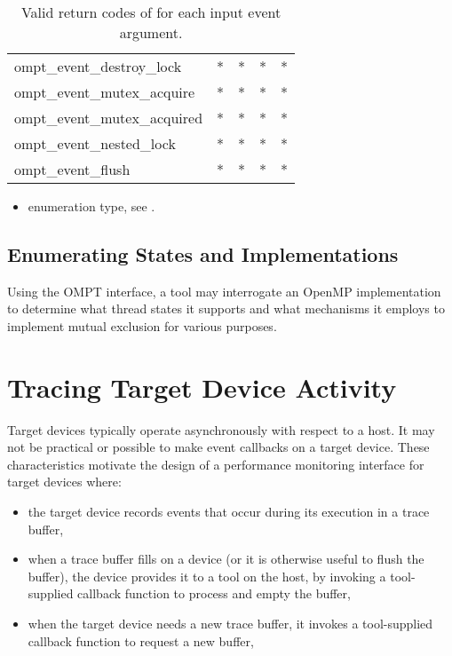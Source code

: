 \begin{table}
\begin{tabular}{lp{3em}p{3em}p{3em}p{3em}}
ompt\_event\_destroy\_lock          & * & * & * & * \\
ompt\_event\_mutex\_acquire         & * & * & * & * \\
ompt\_event\_mutex\_acquired        & * & * & * & * \\
ompt\_event\_nested\_lock           & * & * & * & * \\
ompt\_event\_flush                  & * & * & * & * \\
\bottomrule
\end{tabular}
\caption{Valid return codes of  for each input event argument.}
\label{table:valid_rc}
\end{table}

\crossreferences
\begin{itemize}
\item {} enumeration type, see
.
\end{itemize}

\clearpage

\subsection{Enumerating States and Implementations}
Using the OMPT interface, a tool may interrogate an OpenMP implementation to 
determine what thread states it supports and what mechanisms it employs to 
implement mutual exclusion for various purposes.

\section{Tracing Target Device Activity}
\label{sec:tracing-target-device-activity}

Target devices typically operate asynchronously with respect to a
host. It may not be practical or possible to make event callbacks
on a target device. These characteristics motivate the design of a
performance monitoring interface for target devices where:

\begin{itemize}
\item the target device records events that occur during its execution in a trace buffer,
\item when a trace buffer fills on a device (or it is otherwise useful to flush the buffer),  the device provides it to a tool on the host, by invoking a tool-supplied callback function to process and empty the buffer,
\item when the target device needs a new trace buffer, it invokes a tool-supplied callback function to request a new buffer,
\end{itemize}


